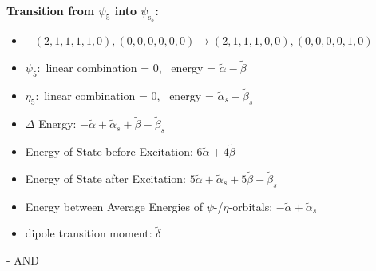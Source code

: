 \documentclass[12pt,a4paper]{article}
\begin{document}
        \noindent\textbf{Transition from $\psi_{5}$ into $\psi_{\text{s}_{5}}$:}
        \begin{itemize}
            \item $- (2, 1, 1, 1, 1, 0), (0, 0, 0, 0, 0, 0) \rightarrow (2, 1, 1, 1, 0, 0), (0, 0, 0, 0, 1, 0)$
        
            \item $\psi_{5}:$ linear combination = $0$, \
            energy = $\tilde{\alpha} - \tilde{\beta}$
            
            \item $\eta_{5}:$ linear combination = $0$, \
            energy = $\tilde{\alpha}_{s} - \tilde{\beta}_{s}$
            
                \item $\Delta$ Energy: $- \tilde{\alpha} + \tilde{\alpha}_{s} + \tilde{\beta} - \tilde{\beta}_{s}$
                \item Energy of State before Excitation: $6 \tilde{\alpha} + 4 \tilde{\beta}$
                \item Energy of State after Excitation: $5 \tilde{\alpha} + \tilde{\alpha}_{s} + 5 \tilde{\beta} - \tilde{\beta}_{s}$
                \item Energy between Average Energies of $\psi$-/$\eta$-orbitals: $- \tilde{\alpha} + \tilde{\alpha}_{s}$
            
            \item dipole transition moment: $\tilde{\delta}$
        
        \end{itemize}
        
 -  AND 
\end{document}
